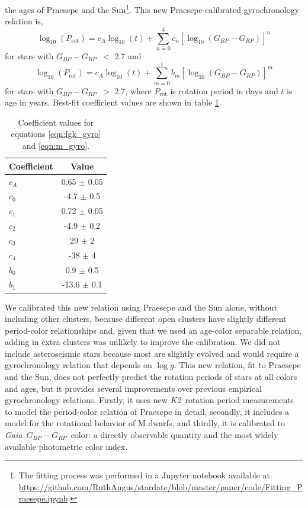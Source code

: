 \documentclass[useAMS, usenatbib, preprint, 12pt]{aastex}
\newcommand{\Ktwo}{{\it K2}}
\newcommand{\ktwo}{\Ktwo}
\newcommand{\Gaia}{{\it Gaia}}
\newcommand{\gcolor}{$G_{BP} - G_{RP}$}
\begin{document}
the ages of Praesepe and the Sun\footnote{The fitting process was
performed in a Jupyter notebook available at
\url{https://github.com/RuthAngus/stardate/blob/master/paper/code/Fitting_Praesepe.ipynb}.}.
This new Praesepe-calibrated gyrochronology relation is,
\begin{equation}
    \log_{10}(P_\mathrm{rot}) =
    c_A\log_{10}(t) +
    \sum_{n=0}^4 c_n[\log_{10}(G_{BP}-G_{RP})]^n
\label{eqn:fgk_gyro}
\end{equation}
for stars with \gcolor\ $<$ 2.7 and
\begin{equation}
    \log_{10}(P_\mathrm{rot}) =
    c_A\log_{10}(t) +
    \sum_{m=0}^1 b_m[\log_{10}(G_{BP}-G_{RP})]^m
\label{eqn:m_gyro}
\end{equation}
for stars with \gcolor\ $>$ 2.7, where $P_{\mathrm{rot}}$ is rotation period
in days and $t$ is age in years.
Best-fit coefficient values are shown in table \ref{tab:coefficients}.
\begin{table}[h!]
  \begin{center}
      \caption{Coefficient values for equations \ref{eqn:fgk_gyro} and
      \ref{eqn:m_gyro}.}
    \label{tab:coefficients}
    \begin{tabular}{l|c} %
      Coefficient & Value  \\
      \hline
      $c_A$ & 0.65 $\pm$ 0.05 \\
      $c_0$ & -4.7 $\pm$ 0.5 \\
      $c_1$ & 0.72 $\pm$ 0.05 \\
      $c_2$ & -4.9 $\pm$ 0.2 \\
      $c_3$ & 29 $\pm$ 2 \\
      $c_4$ & -38 $\pm$ 4 \\
      $b_0$ & 0.9 $\pm$ 0.5 \\
      $b_1$ & -13.6 $\pm$ 0.1 \\
    \end{tabular}
  \end{center}
\end{table}

We calibrated this new relation using Praesepe and the Sun alone, without
including other clusters, because different open clusters have slightly
different period-color relationships \citep{agueros2018, agueros2018b,
curtis2018, curtis2019} and, given that we used an age-color separable
relation, adding in extra clusters was unlikely to improve the calibration.
We did not include asteroseismic stars because most are slightly evolved and
would require a gyrochronology relation that depends on $\log g$.
This new relation, fit to Praesepe and the Sun, does not perfectly predict the
rotation periods of stars at all colors and ages, but it provides several
improvements over previous empirical gyrochronology relations.
Firstly, it uses new \ktwo\ rotation period measurements to model the
period-color relation of Praesepe in detail, secondly, it includes a model for
the rotational behavior of M dwarfs, and thirdly, it is calibrated to \Gaia\
\gcolor\ color: a directly observable quantity and the most widely available
photometric color index.
\end{document}
